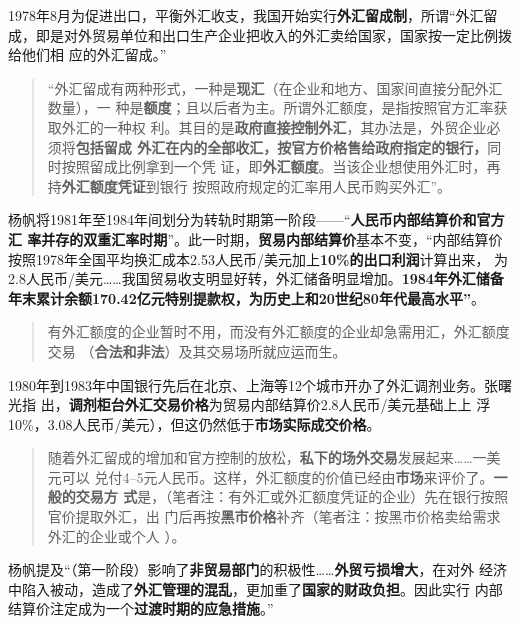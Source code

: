 1978年8月为促进出口，平衡外汇收支，我国开始实行\textbf{外汇留成制}，所谓“外汇留
成，即是对外贸易单位和出口生产企业把收入的外汇卖给国家，国家按一定比例拨给他们相
应的外汇留成。”

\begin{quotation}
  “外汇留成有两种形式，一种是\textbf{现汇}（在企业和地方、国家间直接分配外汇数量），一
  种是\textbf{额度}；且以后者为主。所谓外汇额度，是指按照官方汇率获取外汇的一种权
  利。其目的是\textbf{政府直接控制外汇}，其办法是，外贸企业必须将\textbf{包括留成
    外汇在内的全部收汇，按官方价格售给政府指定的银行，}同时按照留成比例拿到一个凭
  证，即\textbf{外汇额度}。当该企业想使用外汇时，再持\textbf{外汇额度凭证}到银行
  按照政府规定的汇率用人民币购买外汇”。\cite[769]{fengyunshi1b}
\end{quotation}


杨帆将1981年至1984年间划分为转轨时期第一阶段——“\textbf{人民币内部结算价和官方汇
  率并存的双重汇率时期}”。此一时期，\textbf{贸易内部结算价}基本不变，“内部结算价
按照1978年全国平均换汇成本2.53人民币/美元加上\textbf{10\%的出口利润}计算出来，
为2.8人民币/美元……我国贸易收支明显好转，外汇储备明显增加。\textbf{1984年外汇储备
  年末累计余额170.42亿元特别提款权，为历史上和20世纪80年代最高水平”}。

\begin{quotation}
  有外汇额度的企业暂时不用，而没有外汇额度的企业却急需用汇，外汇额度交易
  （\textbf{合法和非法}）及其交易场所就应运而生。\cite[769]{fengyunshi1b}
\end{quotation}

1980年到1983年中国银行先后在北京、上海等12个城市开办了外汇调剂业务。张曙光指
出，\textbf{调剂柜台外汇交易价格}为贸易内部结算价2.8人民币/美元基础上上
浮10\%，3.08人民币/美元），但这仍然低于\textbf{市场实际成交价格}。

\begin{quotation}
  随着外汇留成的增加和官方控制的放松，\textbf{私下的场外交易}发展起来……一美元可以
  兑付4--5元人民币。这样，外汇额度的价值已经由\textbf{市场}来评价了。\textbf{一般的交易方
    式}是，（笔者注：有外汇或外汇额度凭证的企业）先在银行按照官价提取外汇，出
  门后再按\textbf{黑市价格}补齐（笔者注：按黑市价格卖给需求外汇的企业或个人
  ）。\cite[769]{fengyunshi1b}
\end{quotation}

杨帆提及“（第一阶段）影响了\textbf{非贸易部门}的积极性……\textbf{外贸亏损增大}，在对外
经济中陷入被动，造成了\textbf{外汇管理的混乱}，更加重了\textbf{国家的财政负担}。因此实行
内部结算价注定成为一个\textbf{过渡时期的应急措施}。”

